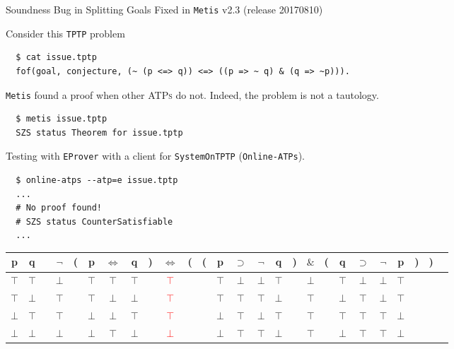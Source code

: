 \documentclass[10pt, xetex, hyperref={pdfpagelabels=false}]{beamer}
\newcommand{\abbre}[1]{\textsc{#1}\xspace}
\newcommand{\ATPs}{\abbre{ATPs}}
\newcommand{\name}[1]{\texttt{#1}\xspace}
\newcommand{\prg}[1]{\texttt{#1}\xspace}
\newcommand{\Metis}{\prg{Metis}}
\newcommand{\len}[1]{\texttt{#1}\xspace}
\newcommand{\TPTP}{\len{TPTP}}
\begin{document}
\begin{frame}[fragile]{Soundness Bug in Splitting Goals}
  {Fixed in \Metis v2.3 (release 20170810)}

Consider this \TPTP problem
\begin{verbatim}
  $ cat issue.tptp
  fof(goal, conjecture, (~ (p <=> q)) <=> ((p => ~ q) & (q => ~p))).
\end{verbatim}

\Metis found a proof when other \ATPs do not. Indeed, the problem is not a tautology.

\begin{verbatim}
  $ metis issue.tptp
  SZS status Theorem for issue.tptp
\end{verbatim}

Testing with \name{EProver} with a client for \name{SystemOnTPTP} (\name{Online-ATPs}).

\begin{verbatim}
  $ online-atps --atp=e issue.tptp
  ...
  # No proof found!
  # SZS status CounterSatisfiable
  ...
\end{verbatim}

\end{frame}

\begin{frame}[fragile]
\begin{tabular}{@{ }c@{ }@{ }c | c@{ }@{ }c@{ }@{}c@{}@{ }c@{ }@{ }c@{ }@{ }c@{ }@{}c@{}@{ }c@{ }@{}c@{}@{}c@{}@{ }c@{ }@{ }c@{ }@{ }c@{ }@{ }c@{ }@{}c@{}@{ }c@{ }@{}c@{}@{ }c@{ }@{ }c@{ }@{ }c@{ }@{ }c@{ }@{}c@{}@{}c@{}@{ }c}
p & q &  & $¬$ & ( & p & $⇔$ & q & ) & $⇔$ & ( & ( & p & $⊃$ & $¬$ & q & ) & $\&$ & ( & q & $⊃$ & $¬$ & p & ) & ) & \\
\hline
$\top$ & $\top$ &  & $\bot$ &  & $\top$ & $\top$ & $\top$ &  & \textcolor{red}{$\top$} &  &  & $\top$ & $\bot$ & $\bot$ & $\top$ &  & $\bot$ &  & $\top$ & $\bot$ & $\bot$ & $\top$ &  &  & \\
$\top$ & $\bot$ &  & $\top$ &  & $\top$ & $\bot$ & $\bot$ &  & \textcolor{red}{$\top$} &  &  & $\top$ & $\top$ & $\top$ & $\bot$ &  & $\top$ &  & $\bot$ & $\top$ & $\bot$ & $\top$ &  &  & \\
$\bot$ & $\top$ &  & $\top$ &  & $\bot$ & $\bot$ & $\top$ &  & \textcolor{red}{$\top$} &  &  & $\bot$ & $\top$ & $\bot$ & $\top$ &  & $\top$ &  & $\top$ & $\top$ & $\top$ & $\bot$ &  &  & \\
$\bot$ & $\bot$ &  & $\bot$ &  & $\bot$ & $\top$ & $\bot$ &  & \textcolor{red}{$\bot$} &  &  & $\bot$ & $\top$ & $\top$ & $\bot$ &  & $\top$ &  & $\bot$ & $\top$ & $\top$ & $\bot$ &  &  & \\
\end{tabular}
\end{frame}
\end{document}

